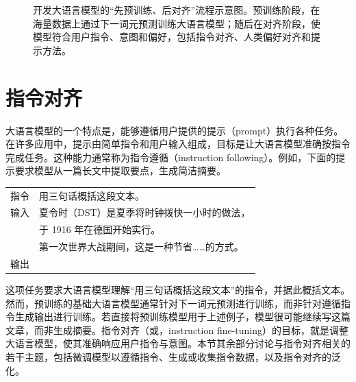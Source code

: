 \begin{figure}[!t]
\centering

\caption{开发大语言模型的“先预训练、后对齐”流程示意图。预训练阶段，在海量数据上通过下一词元预测训练大语言模型；随后在对齐阶段，使模型符合用户指令、意图和偏好，包括指令对齐、人类偏好对齐和提示方法。}
\label{fig:pre-training-then-alignment}
\end{figure}


\section{指令对齐}

\noindent 大语言模型的一个特点是，能够遵循用户提供的提示（prompt）执行各种任务。在许多应用中，提示由简单指令和用户输入组成，目标是让大语言模型准确按指令完成任务。这种能力通常称为指令遵循（instruction following）。例如，下面的提示要求模型从一篇长文中提取要点，生成简洁摘要。

\vspace{0.5em}
\begin{tcolorbox}

\begingroup
\renewcommand{\arraystretch}{1.0}
\setlength{\tabcolsep}{6pt}
\begin{tabular}{r l}
{\color{gray} \small{指令}} & 用三句话概括这段文本。 \\ [0.2cm]
{\color{gray} \small{输入}} & 夏令时（DST）是夏季将时钟拨快一小时的做法，\\
& 于 1916 年在德国开始实行。\\
& 第一次世界大战期间，这是一种节省……的方式。 \\ [0.2cm]
{\color{gray} \small{输出}} & \underline{\hspace{2em}}
\end{tabular}
\endgroup

\end{tcolorbox}
\vspace{0.5em}

\noindent 这项任务要求大语言模型理解“用三句话概括这段文本”的指令，并据此概括文本。然而，预训练的基础大语言模型通常针对下一词元预测进行训练，而非针对遵循指令生成输出进行训练。若直接将预训练模型用于上述例子，模型很可能继续写这篇文章，而非生成摘要。指令对齐（或，instruction fine-tuning）的目标，就是调整大语言模型，使其准确响应用户指令与意图。本节其余部分讨论与指令对齐相关的若干主题，包括微调模型以遵循指令、生成或收集指令数据，以及指令对齐的泛化。

